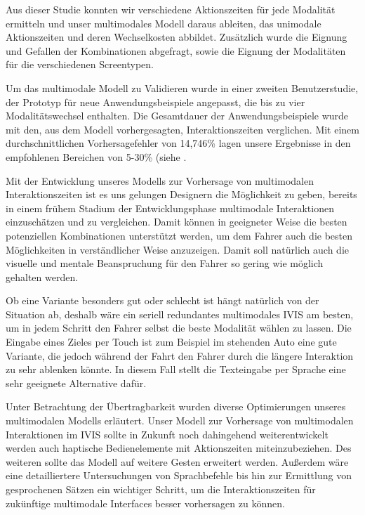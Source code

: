 Aus dieser Studie konnten wir verschiedene Aktionszeiten für jede Modalität ermitteln und unser multimodales Modell daraus ableiten, das unimodale Aktionszeiten und deren Wechselkosten abbildet. 
Zusätzlich wurde die Eignung und Gefallen der Kombinationen abgefragt, sowie die Eignung der Modalitäten für die verschiedenen Screentypen.

Um das multimodale Modell zu Validieren wurde in einer zweiten Benutzerstudie, der Prototyp für neue Anwendungsbeispiele angepasst, die bis zu vier Modalitätswechsel enthalten.
Die Gesamtdauer der Anwendungsbeispiele wurde mit den, aus dem Modell vorhergesagten, Interaktionszeiten verglichen. 
Mit einem durchschnittlichen Vorhersagefehler von 14,746\% lagen unsere Ergebnisse in den empfohlenen Bereichen von 5-30\% (siehe \citep{Card_1980, Luo_2005,Teo:2006}. 

Mit der Entwicklung unseres Modells zur Vorhersage von multimodalen Interaktionszeiten ist es uns gelungen Designern die Möglichkeit zu geben, bereits in einem frühem Stadium der Entwicklungsphase multimodale Interaktionen einzuschätzen und zu vergleichen. 
Damit können in geeigneter Weise die besten potenziellen Kombinationen unterstützt werden, um dem Fahrer auch die besten Möglichkeiten in verständlicher Weise anzuzeigen. 
Damit soll natürlich auch die visuelle und mentale Beanspruchung für den Fahrer so gering wie möglich gehalten werden. 

Ob eine Variante besonders gut oder schlecht ist hängt natürlich von der Situation ab, deshalb wäre ein seriell redundantes multimodales IVIS am besten, um in jedem Schritt den Fahrer selbst die beste Modalität wählen zu lassen. 
Die Eingabe eines Zieles per Touch ist zum Beispiel im stehenden Auto eine gute Variante, die jedoch während der Fahrt den Fahrer durch die längere Interaktion zu sehr ablenken könnte. 
In diesem Fall stellt die Texteingabe per Sprache eine sehr geeignete Alternative dafür.

Unter Betrachtung der Übertragbarkeit wurden diverse Optimierungen unseres multimodalen Modells erläutert.
Unser Modell zur Vorhersage von multimodalen Interaktionen im IVIS sollte in Zukunft noch dahingehend weiterentwickelt werden auch haptische Bedienelemente mit Aktionszeiten miteinzubeziehen. 
Des weiteren sollte das Modell auf weitere Gesten erweitert werden. 
Außerdem wäre eine detailliertere Untersuchungen von Sprachbefehle bis hin zur Ermittlung von gesprochenen Sätzen ein wichtiger Schritt, um die Interaktionszeiten für zukünftige multimodale Interfaces besser vorhersagen zu können.

